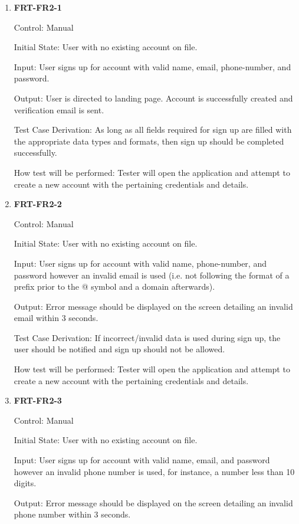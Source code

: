\documentclass[12pt, titlepage]{article}
\begin{document}
\begin{enumerate}

\item{\textbf{FRT-FR2-1}}

Control: Manual
					
Initial State: User with no existing account on file.
					
Input: User signs up for account with valid name, email, phone-number, and password.
					
Output: User is directed to landing page. Account is successfully created and verification email is sent.

Test Case Derivation: As long as all fields required for sign up are filled with the appropriate data types and formats,
then sign up should be completed successfully.
					
How test will be performed: Tester will open the application and attempt to create a new account with the pertaining credentials and details. 
					
\item{\textbf{FRT-FR2-2}}

Control: Manual
					
Initial State: User with no existing account on file.
					
Input: User signs up for account with valid name, phone-number, and password however
an invalid email is used (i.e. not following the format of a prefix prior to the @ symbol and a domain afterwards).
					
Output: Error message should be displayed on the screen detailing an invalid email within 3 seconds.

Test Case Derivation: If incorrect/invalid data is used during sign up, the user should be notified and sign up should
not be allowed.

How test will be performed: Tester will open the application and attempt to create a new account with the pertaining credentials and details. 

\item{\textbf{FRT-FR2-3}}

Control: Manual
          
Initial State: User with no existing account on file.
          
Input: User signs up for account with valid name, email, and password however an
invalid phone number is used, for instance, a number less than 10 digits.
          
Output: Error message should be displayed on the screen detailing an invalid phone number within 3 seconds.


\end{enumerate}
\end{document}
